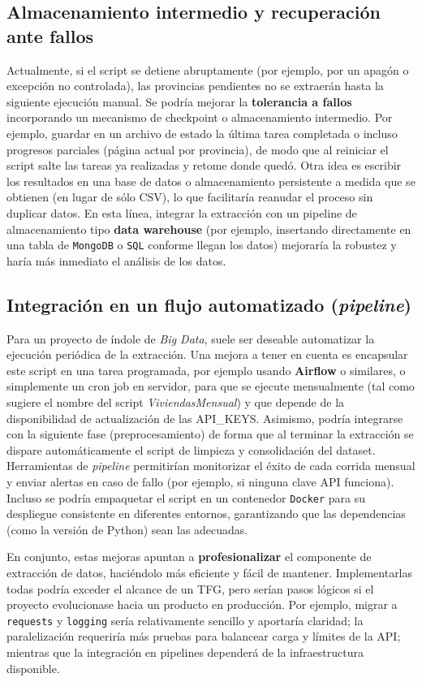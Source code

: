 \documentclass[a4paper,11pt]{book}
\begin{document}
\subsection*{Almacenamiento intermedio y recuperación ante fallos}
Actualmente, si el script se detiene abruptamente (por ejemplo, por un apagón o excepción no controlada), las provincias pendientes no se extraerán hasta la siguiente ejecución manual. Se podría mejorar la \textbf{tolerancia a fallos} incorporando un mecanismo de checkpoint o almacenamiento intermedio. Por ejemplo, guardar en un archivo de estado la última tarea completada o incluso progresos parciales (página actual por provincia), de modo que al reiniciar el script salte las tareas ya realizadas y retome donde quedó. Otra idea es escribir los resultados en una base de datos o almacenamiento persistente a medida que se obtienen (en lugar de sólo CSV), lo que facilitaría reanudar el proceso sin duplicar datos. En esta línea, integrar la extracción con un pipeline de almacenamiento tipo \textbf{data warehouse} (por ejemplo, insertando directamente en una tabla de \texttt{MongoDB} o \texttt{SQL} conforme llegan los datos) mejoraría la robustez y haría más inmediato el análisis de los datos.

\subsection*{Integración en un flujo automatizado (\textit{pipeline})}
Para un proyecto de índole de  \textit{Big Data}, suele ser deseable automatizar la ejecución periódica de la extracción. Una mejora a tener en cuenta es encapsular este script en una tarea programada, por ejemplo usando \textbf{Airflow} o similares, o simplemente un cron job en servidor, para que se ejecute mensualmente (tal como sugiere el nombre del script \textit{ViviendasMensual}) y que depende de la disponibilidad de actualización de las API_KEYS. Asimismo, podría integrarse con la siguiente fase (preprocesamiento) de forma que al terminar la extracción se dispare automáticamente el script de limpieza y consolidación del dataset. Herramientas de \textit{pipeline} permitirían monitorizar el éxito de cada corrida mensual y enviar alertas en caso de fallo (por ejemplo, si ninguna clave API funciona). Incluso se podría empaquetar el script en un contenedor \texttt{Docker} para su despliegue consistente en diferentes entornos, garantizando que las dependencias (como la versión de Python) sean las adecuadas.

En conjunto, estas mejoras apuntan a \textbf{profesionalizar} el componente de extracción de datos, haciéndolo más eficiente y fácil de mantener. Implementarlas todas podría exceder el alcance de un TFG, pero serían pasos lógicos si el proyecto evolucionase hacia un producto en producción. Por ejemplo, migrar a \texttt{requests} y \texttt{logging} sería relativamente sencillo y aportaría claridad; la paralelización requeriría más pruebas para balancear carga y límites de la API; mientras que la integración en pipelines dependerá de la infraestructura disponible.
\end{document}
